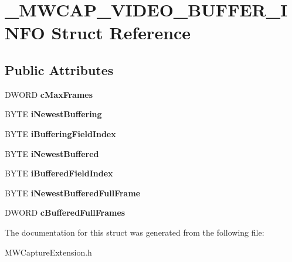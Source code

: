 \hypertarget{struct__MWCAP__VIDEO__BUFFER__INFO}{\section{\-\_\-\-M\-W\-C\-A\-P\-\_\-\-V\-I\-D\-E\-O\-\_\-\-B\-U\-F\-F\-E\-R\-\_\-\-I\-N\-F\-O Struct Reference}
\label{struct__MWCAP__VIDEO__BUFFER__INFO}
}
\subsection*{Public Attributes}
\begin{DoxyCompactItemize}
\item 
\hypertarget{struct__MWCAP__VIDEO__BUFFER__INFO_abcee9233ec0e7289488605874072e7b2}{D\-W\-O\-R\-D {\bfseries c\-Max\-Frames}}\label{struct__MWCAP__VIDEO__BUFFER__INFO_abcee9233ec0e7289488605874072e7b2}

\item 
\hypertarget{struct__MWCAP__VIDEO__BUFFER__INFO_add18d253b33999638d382ebb5bfef981}{B\-Y\-T\-E {\bfseries i\-Newest\-Buffering}}\label{struct__MWCAP__VIDEO__BUFFER__INFO_add18d253b33999638d382ebb5bfef981}

\item 
\hypertarget{struct__MWCAP__VIDEO__BUFFER__INFO_a4b54d0f1c9a1c076c6bde06a1832a3b0}{B\-Y\-T\-E {\bfseries i\-Buffering\-Field\-Index}}\label{struct__MWCAP__VIDEO__BUFFER__INFO_a4b54d0f1c9a1c076c6bde06a1832a3b0}

\item 
\hypertarget{struct__MWCAP__VIDEO__BUFFER__INFO_a41cbc3da32c62871b83ac22799b409ea}{B\-Y\-T\-E {\bfseries i\-Newest\-Buffered}}\label{struct__MWCAP__VIDEO__BUFFER__INFO_a41cbc3da32c62871b83ac22799b409ea}

\item 
\hypertarget{struct__MWCAP__VIDEO__BUFFER__INFO_a64b7087d8bc43e925780f8d67f1691f6}{B\-Y\-T\-E {\bfseries i\-Buffered\-Field\-Index}}\label{struct__MWCAP__VIDEO__BUFFER__INFO_a64b7087d8bc43e925780f8d67f1691f6}

\item 
\hypertarget{struct__MWCAP__VIDEO__BUFFER__INFO_a8b9ece30fd81c2395e75d40daa2b45fa}{B\-Y\-T\-E {\bfseries i\-Newest\-Buffered\-Full\-Frame}}\label{struct__MWCAP__VIDEO__BUFFER__INFO_a8b9ece30fd81c2395e75d40daa2b45fa}

\item 
\hypertarget{struct__MWCAP__VIDEO__BUFFER__INFO_a6125d267c63c6f8c0e18384b8b4aaefb}{D\-W\-O\-R\-D {\bfseries c\-Buffered\-Full\-Frames}}\label{struct__MWCAP__VIDEO__BUFFER__INFO_a6125d267c63c6f8c0e18384b8b4aaefb}

\end{DoxyCompactItemize}


The documentation for this struct was generated from the following file\-:\begin{DoxyCompactItemize}
\item 
M\-W\-Capture\-Extension.\-h\end{DoxyCompactItemize}

